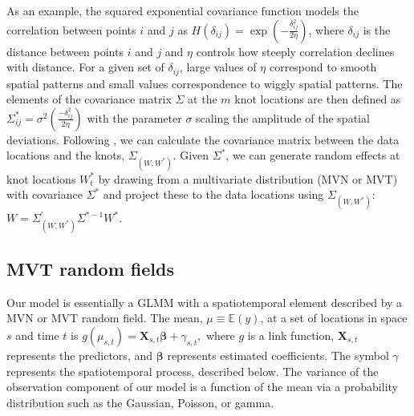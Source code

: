 \documentclass[12pt,english]{article}
\begin{document}
\begin{spacing}{1.9}
As an example, the squared exponential covariance function models the
correlation between points $i$ and $j$ as $H(\delta_{ij}) = \exp
\left(-\frac{\delta_{ij}^2}{2 \eta} \right)$, where $\delta_{ij}$ is the
distance between points $i$ and $j$ and $\eta$ controls how steeply correlation
declines with distance. For a given set of $\delta_{ij}$, large values of $\eta$
correspond to smooth spatial patterns and small values correspondence to wiggly
spatial patterns.
The elements of the covariance matrix $\Sigma$ at the $m$ knot locations are
then defined as $\Sigma_{ij}^*=\sigma^2 \left( \frac{-\delta_{ij}^2}{2 \eta}
\right)$ with the parameter $\sigma$ scaling the amplitude of the spatial
deviations. Following \citet{latimer2009}, we can calculate the covariance
matrix between the data locations and the knots, $\Sigma_{\left(W, W^*
  \right)}$. Given $\Sigma^*$, we can generate random effects at knot locations
$W_t^*$ by drawing from a multivariate distribution (MVN or MVT) with covariance
$\Sigma^*$ and project these to the data locations using $\Sigma_{\left( W,W^{*}
  \right)}$: $W=\Sigma_{\left(W,W^* \right)}^{'} \Sigma^{*-1}W^*$.


\subsection{MVT random fields}

Our model is essentially a GLMM with a spatiotemporal element described by a MVN
or MVT random field. The mean, $\mu \equiv \mathbb{E}(y)$, at a set of locations
in space $s$ and time $t$ is $g(\mu_{s,t}) = \bm{X}_{s,t} \bm{\beta} +
\gamma_{s,t},$ where $g$ is a link function, $\bm{X}_{s,t}$ represents the
predictors, and $\bm{\beta}$ represents estimated coefficients. The symbol
$\gamma$ represents the spatiotemporal process, described below. The variance of
the observation component of our model is a function of the mean via a
probability distribution such as the Gaussian, Poisson, or gamma.


\end{spacing}
\end{document}
